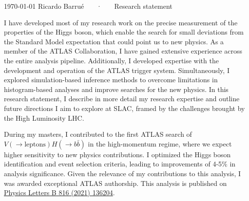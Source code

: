 \documentclass[11pt, a4paper]{awesome-cv}
\begin{document}
\makecvheader[R]

\makecvfooter
  {\today}
  {Ricardo Barrué ~~~·~~~ Research statement}
  {}

\makelettertitle

\begin{cvletter}

I have developed most of my research work on the precise measurement of the properties of the Higgs boson, which enable the search for small deviations from the Standard Model expectation that could point us to new physics. As a member of the ATLAS Collaboration, I have gained extensive experience across the entire analysis pipeline. Additionally, I developed expertise with the development and operation of the ATLAS trigger system. Simultaneously, I explored simulation-based inference methods to overcome limitations in histogram-based analyses and improve searches for the new physics. In this research statement, I describe in more detail my research expertise and outline future directions I aim to explore at SLAC, framed by the challenges brought by the High Luminosity LHC.


During my masters, I contributed to the first ATLAS search of $V(\to \textrm{leptons})H(\to b\bar{b})$ in the high-momentum regime, where we expect higher sensitivity to new physics contributions. I optimized the Higgs boson identification and event selection criteria, leading to improvements of 4-5\% in analysis significance. Given the relevance of my contributions to this analysis, I was awarded exceptional ATLAS authorship. This analysis is published on \href{https://doi.org/10.1016/j.physletb.2021.136204}{Physics Letters B 816 (2021) 136204}.


\end{cvletter}
\end{document}
